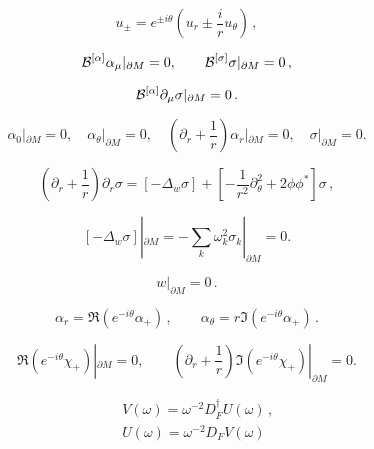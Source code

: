 \documentclass[]{article}
\begin{document}
\begin{equation}
	u_\pm = e^{\pm i\theta} \left( u_r \pm \frac ir u_\theta \right)\,,
	\label{pmrt}
\end{equation}

\begin{equation}
	{\cal B}^{[\alpha]} \alpha_\mu |_{\partial M}=0,\qquad
	{\cal B}^{[\sigma]} \sigma |_{\partial M}=0 \,,\label{bops}
\end{equation}

\begin{equation}
	{\cal B}^{[\alpha]} \partial_\mu \sigma |_{\partial M}=0 \,.
	\label{gauinv}
\end{equation}

\begin{equation}
	\alpha_0|_{\partial M}=0,\quad
	\alpha_\theta |_{\partial M}=0,\quad
	\left( \partial_r +\frac 1r \right) \alpha_r |_{\partial M}=0,\quad
	\sigma |_{\partial M}=0.\label{asbc}
\end{equation}

\begin{equation}
	\left( \partial_r +\frac 1r \right) \partial_r \sigma =
	\left[ -\Delta_w \sigma \right] +
	\left[ - \frac 1{r^2}\partial_\theta^2 + 2\phi\phi^* \right]\sigma
	\,,\label{ginar}
\end{equation}

\begin{equation}
	\left[ -\Delta_w \sigma \right]|_{\partial M} =
	-\sum_k \omega_k^2 \sigma_k |_{\partial M} =0.\label{1stterm}
\end{equation}

\begin{equation}
	w|_{\partial M}=0 \,.\label{bcw}
\end{equation}

\begin{equation}
	\alpha_r =\Re \left( e^{-i\theta} \alpha_+ \right)\,,\qquad
	\alpha_\theta = r \Im \left( e^{-i\theta }\alpha_+ \right)\,.
	\label{rthetaplus}
\end{equation}

\begin{equation}
	\Re \left( e^{-i\theta} \chi_+ \right) |_{\partial M}=0,
	\qquad \left( \partial_r +\frac 1r \right) \Im
	\left( e^{-i\theta} \chi_+ \right) |_{\partial M}=0.
	\label{bcchip}
\end{equation}

\begin{eqnarray}
	&&V(\omega )=\omega^{-2} D_F^\dag U(\omega )\,,\label{VomU}\\
	&&U(\omega )=\omega^{-2} D_F V(\omega )\label{UomV}
\end{eqnarray}
\end{document}
